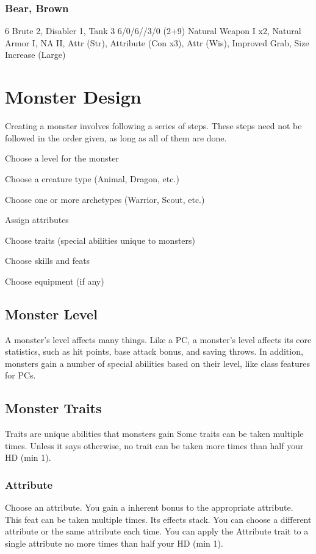 \subsubsection{Bear, Brown}
 6
 Brute 2, Disabler 1, Tank 3
 6/0/6//3/0
 (2+9) Natural Weapon I x2, Natural Armor I, NA II, Attr (Str), Attribute (Con x3), Attr (Wis), Improved Grab, Size Increase (Large)

\section{Monster Design}

Creating a monster involves following a series of steps. These steps need not be followed in the order given, as long as all of them are done.

\begin{enumerate*}
    \item Choose a level for the monster
    \item Choose a creature type (Animal, Dragon, etc.)
    \item Choose one or more archetypes (Warrior, Scout, etc.)
    \item Assign attributes
    \item Choose traits (special abilities unique to monsters)
    \item Choose skills and feats
    \item Choose equipment (if any)
\end{enumerate*}

\subsection{Monster Level}
A monster's level affects many things. Like a PC, a monster's level affects its core statistics, such as hit points, base attack bonus, and saving throws. In addition, monsters gain a number of special abilities based on their level, like class features for PCs.

\subsection{Monster Traits}
Traits are unique abilities that monsters gain
Some traits can be taken multiple times. Unless it says otherwise, no trait can be taken more times than half your HD (min 1).

\subsubsection{Attribute}
Choose an attribute.
\featben You gain a  inherent bonus to the appropriate attribute.
 This feat can be taken multiple times. Its effects stack. You can choose a different attribute or the same attribute each time. You can apply the Attribute trait to a single attribute no more times than half your HD (min 1).

